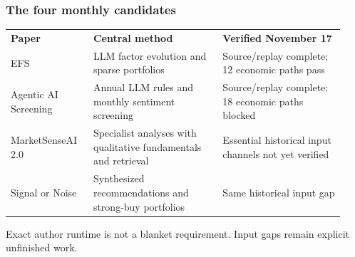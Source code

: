 \documentclass[aspectratio=169,10pt,xcolor=table]{beamer}
\begin{document}
\begin{frame}[t]
\frametitle{The four monthly candidates}
\relax
{\fontsize{8.2}{10.2}\selectfont\renewcommand{\arraystretch}{1.23}\setlength{\tabcolsep}{4pt}
\begin{tabular}{>{\raggedright\arraybackslash}p{0.23\linewidth}>{\raggedright\arraybackslash}p{0.36\linewidth}>{\raggedright\arraybackslash}p{0.34\linewidth}}
\rowcolor{Navy} \textcolor{Paper}{\textbf{Paper}} & \textcolor{Paper}{\textbf{Central method}} & \textcolor{Paper}{\textbf{Verified November 17}}\\
\rowcolor{Paper} \textcolor{Ink}{EFS} & \textcolor{Ink}{LLM factor evolution and sparse portfolios} & \textcolor{Ink}{Source/replay complete; 12 economic paths pass}\\[2pt]
\rowcolor{Light} \textcolor{Ink}{Agentic AI Screening} & \textcolor{Ink}{Annual LLM rules and monthly sentiment screening} & \textcolor{Ink}{Source/replay complete; 18 economic paths blocked}\\[2pt]
\rowcolor{Paper} \textcolor{Ink}{MarketSenseAI 2.0} & \textcolor{Ink}{Specialist analyses with qualitative fundamentals and retrieval} & \textcolor{Ink}{Essential historical input channels not yet verified}\\[2pt]
\rowcolor{Light} \textcolor{Ink}{Signal or Noise} & \textcolor{Ink}{Synthesized recommendations and strong-buy portfolios} & \textcolor{Ink}{Same historical input gap}\\[2pt]
\end{tabular}
}
\par\vspace{.3cm}
{\scriptsize\color{Muted} Exact author runtime is not a blanket requirement. Input gaps remain explicit unfinished work.}\par\medskip
{}
\end{frame}
\end{document}
